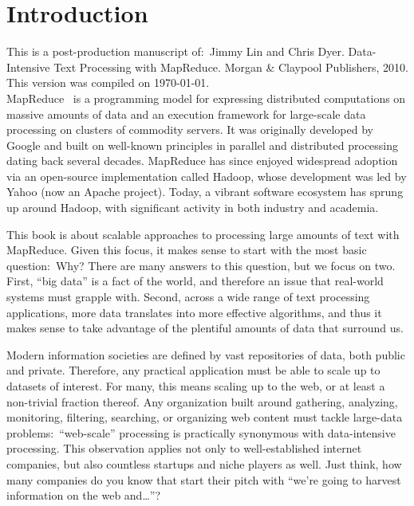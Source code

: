 \chapter{Introduction}
\label{chapter1}

\thispagestyle{empty}

\noindent This is a post-production manuscript of:\ Jimmy Lin and
Chris Dyer. Data-Intensive Text Processing with MapReduce. Morgan \&
Claypool Publishers, 2010. This version was compiled on \today.\\

MapReduce~\cite{Dean_Ghemawat_OSDI2004} is a programming model for
expressing distributed computations on massive amounts of data and an
execution framework for large-scale data processing on clusters of
commodity servers.  It was originally developed by Google and built on
well-known principles in parallel and distributed processing dating
back several decades.  MapReduce has since enjoyed widespread adoption
via an open-source implementation called Hadoop, whose development was
led by Yahoo (now an Apache project).  Today, a vibrant software
ecosystem has sprung up around Hadoop, with significant activity in
both industry and academia.

This book is about scalable approaches to processing large amounts of
text with MapReduce.  Given this focus, it makes sense to start with
the most basic question:\ Why?  There are many answers to this
question, but we focus on two.  First, ``big data'' is a fact of the
world, and therefore an issue that real-world systems must grapple
with.  Second, across a wide range of text processing applications,
more data translates into more effective algorithms, and thus it makes
sense to take advantage of the plentiful amounts of data that surround
us.

Modern information societies are defined by vast repositories of data,
both public and private.  Therefore, any practical application must be
able to scale up to datasets of interest.  For many, this means
scaling up to the web, or at least a non-trivial fraction thereof.
Any organization built around gathering, analyzing, monitoring,
filtering, searching, or organizing web content must tackle large-data
problems:\ ``web-scale'' processing is practically synonymous with
data-intensive processing.  This observation applies not only to
well-established internet companies, but also countless startups and
niche players as well.  Just think, how many companies do you know
that start their pitch with ``we're going to harvest information on
the web and\ldots''?

